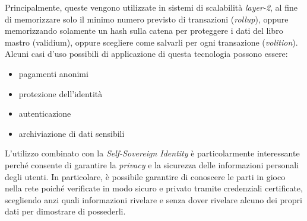 Principalmente, queste vengono utilizzate in sistemi di scalabilità \textit{layer-2}, al fine di memorizzare solo il minimo numero previsto di transazioni (\textit{rollup}),
oppure memorizzando solamente un hash sulla catena per proteggere i dati del libro mastro (validium), oppure scegliere come salvarli per ogni transazione (\textit{volition}).
Alcuni casi d'uso possibili di applicazione di questa tecnologia possono essere:
\begin{itemize}
    \item{pagamenti anonimi}
    \item{protezione dell'identità}
    \item{autenticazione}
    \item{archiviazione di dati sensibili}
\end{itemize}

L'utilizzo combinato con la \textit{Self-Sovereign Identity} è particolarmente interessante perché consente di garantire la \textit{privacy} e la sicurezza delle informazioni personali degli utenti.
In particolare, è possibile garantire di conoscere le parti in gioco nella rete poiché verificate
in modo sicuro e privato tramite credenziali certificate, scegliendo anzi quali informazioni rivelare e senza
dover rivelare alcuno dei propri dati per dimostrare di possederli. 